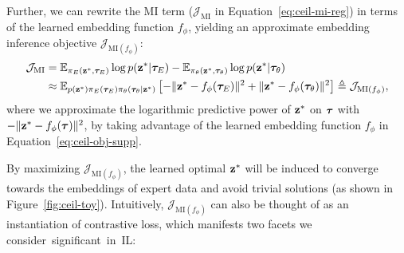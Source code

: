 Further, we can rewrite the MI term ($\mathcal{J}_\text{MI}$ in Equation~\ref{eq:ceil-mi-reg}) in terms of the learned embedding function $f_\phi$, yielding an approximate embedding inference objective $\mathcal{J}_{\text{MI}(f_\phi)}$: %
\begin{align}
	\mathcal{J}_\text{MI} 
	&= \mathbb{E}_{\pi_E({\mathbf{z}}^*, {\bm{\tau}}_E)}\log p({\mathbf{z}}^*|{\bm{\tau}}_E) - \mathbb{E}_{\pi_\theta({\mathbf{z}}^*, {\bm{\tau}}_\theta)}\log p({\mathbf{z}}^*|{\bm{\tau}}_\theta)  \nonumber \\
	&\approx \mathbb{E}_{p({\mathbf{z}}^*)\pi_E({\bm{\tau}}_E)\pi_\theta({\bm{\tau}}_\theta|{\mathbf{z}}^*)} \left[ - \Vert{\mathbf{z}}^*-f_\phi({\bm{\tau}}_E)\Vert^2 + \Vert{\mathbf{z}}^*-f_\phi({\bm{\tau}}_\theta)\Vert^2 \right] \nonumber \triangleq \mathcal{J}_{\text{MI}(f_\phi)}, 
\end{align} %
where we approximate the logarithmic predictive power of ${\mathbf{z}}^*$ on ${\bm{\tau}}$ with $- \Vert{\mathbf{z}}^*-f_\phi({\bm{\tau}})\Vert^2$, by taking advantage of the learned embedding function $f_\phi$ in Equation~\ref{eq:ceil-obj-supp}. 




By maximizing $\mathcal{J}_{\text{MI}(f_\phi)}$, %
the learned optimal ${\mathbf{z}}^*$ will be induced to converge towards the embeddings of expert data and avoid trivial solutions (as shown in Figure~\ref{fig:ceil-toy}). 
Intuitively, 
$\mathcal{J}_{\text{MI}(f_\phi)}$ can also be thought of as an instantiation of contrastive loss, which manifests two facets we consider~significant~in~IL: 

